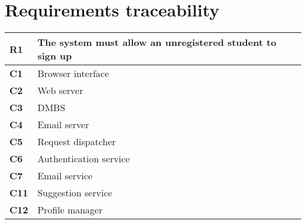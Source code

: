 \chapter{Requirements traceability}

\begin{table}[H]
    \centering
    \begin{tabular}{|l|m{10cm}|}
        \hline \textbf{R1} & The system must allow an unregistered student to sign up \\
        \hline \textbf{C1} & Browser interface \\
        \hline \textbf{C2} & Web server \\
        \hline \textbf{C3} & DMBS \\
        \hline \textbf{C4} & Email server \\
        \hline \textbf{C5} & Request dispatcher \\
        \hline \textbf{C6} & Authentication service \\
        \hline \textbf{C7} & Email service \\
        \hline \textbf{C11} & Suggestion service \\
        \hline \textbf{C12} & Profile manager \\
        \hline
    \end{tabular}
\end{table}

